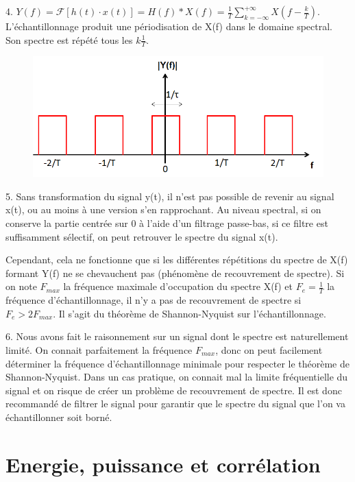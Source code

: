 \documentclass[11pt]{report}
\begin{document}
	4. $Y(f)=\mathcal{F}[h(t)\cdot x(t)]=H(f)*X(f)=\frac{1}{T}\sum_{k=-\infty}^{+\infty}X(f-\frac{k}{T})$. L'échantillonnage produit une périodisation de X(f) dans le domaine spectral. Son spectre est répété tous les $k\frac{1}{T}$.
	
	\begin{figure}[h!]
		\centering
		\includegraphics[scale=0.5]{images/TD_7_Exo_7.png} 
	\end{figure}

	5. Sans transformation du signal y(t), il n'est pas possible de revenir au signal x(t), ou au moins à une version s'en rapprochant. Au niveau spectral, si on conserve la partie centrée sur 0 à l'aide d'un filtrage passe-bas, si ce filtre est suffisamment sélectif, on peut retrouver le spectre du signal x(t).
	
	Cependant, cela ne fonctionne que si les différentes répétitions du spectre de X(f) formant Y(f) ne se chevauchent pas (phénomène de recouvrement de spectre). Si on note $F_{max}$ la fréquence maximale d'occupation du spectre X(f) et $F_{e}=\frac{1}{T}$ la fréquence d'échantillonnage, il n'y a pas de recouvrement de spectre si $F_{e} > 2F_{max}$. Il s'agit du théorème de Shannon-Nyquist sur l'échantillonnage.
	
	6. Nous avons fait le raisonnement sur un signal dont le spectre est naturellement limité. On connait parfaitement la fréquence $F_{max}$, donc on peut facilement déterminer la fréquence d'échantillonnage minimale pour respecter le théorème de Shannon-Nyquist. Dans un cas pratique, on connait mal la limite fréquentielle du signal et on risque de créer un problème de recouvrement de spectre. Il est donc recommandé de filtrer le signal pour garantir que le spectre du signal que l'on va échantillonner soit borné. 
	
	
	
	
	\newpage
	
		
	
	\chapter{Energie, puissance et corrélation}
	
\end{document}
